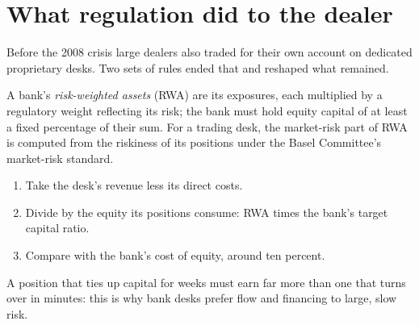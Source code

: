 \begin{omfigure}

\end{omfigure}

\section{What regulation did to the dealer}

Before the 2008 crisis large dealers also traded for their own account on
dedicated proprietary desks. Two sets of
rules ended that and reshaped what remained.

\begin{definition}\label{def:m1:the-sell-side:rwa}
A bank's \emph{risk-weighted assets} (RWA) are
its exposures, each multiplied by a regulatory weight reflecting its risk;
the bank must hold equity capital of at least a fixed percentage of their
sum. For a trading desk, the market-risk part of RWA is computed from the
riskiness of its positions under the Basel Committee's market-risk standard.
\end{definition}

\begin{method}\label{met:m1:the-sell-side:roc}
\begin{enumerate}
\item Take the desk's revenue less its direct costs.
\item Divide by the equity its positions consume: RWA times the bank's
  target capital ratio.
\item Compare with the bank's cost of equity, around ten percent.
\end{enumerate}
A position that ties up capital for weeks must earn far more than one that
turns over in minutes: this is why bank desks prefer flow and financing to
large, slow risk.
\end{method}

